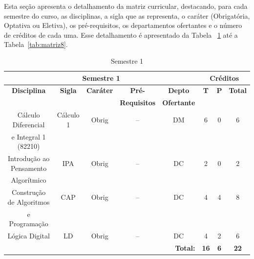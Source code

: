 Esta seção apresenta o detalhamento da matriz curricular, destacando, para cada semestre do curso, as disciplinas, a sigla que as representa, o caráter (Obrigatória, Optativa ou Eletiva), os pré-requisitos, os departamentos ofertantes e o número de  créditos de cada uma. Esse detalhamento é apresentado da Tabela ~\ref{tab:matriz1} até a Tabela~\ref{tab:matriz8}.


\singlespacing


\begin{table}[H]
\caption{Semestre 1}
\centering
\footnotesize
\begin{tabular}{|c|c|c|c|c|c|c|c|} %
\hline
\hline
\multicolumn{5}{|c|}{\textbf{Semestre 1}}  &  \multicolumn{3}{|c|}{\textbf{Créditos}} \\
\hline
\hline
\textbf{Disciplina} & \textbf{Sigla} & \textbf{Caráter} & \textbf{Pré-} & \textbf{Depto} &  \textbf{T}  &  \textbf{P}  & \textbf{Total} \\ 
& & & \textbf{Requisitos}  & \textbf{Ofertante} & & & \\
\hline 
Cálculo Diferencial & Cálculo 1 & Obrig & -- & DM  & 6 & 0 & 6 \\
e Integral 1 (82210)& & & & & & & \\
\hline
Introdução ao Pensamento & IPA & Obrig & -- & DC  & 2 & 0 & 2 \\
Algorítmico & & & & & & & \\
\hline
Construção de Algoritmos & CAP & Obrig & -- & DC  & 4 & 4 & 8 \\
e Programação & & & & & & & \\
\hline
Lógica Digital & LD & Obrig & -- & DC & 4 & 2 & 6 \\
\hline
\hline
\multicolumn{5}{|r|}{\textbf{Total:}}  &  \textbf{16}  &  \textbf{6}   & \textbf{22} \\ %
\hline
\hline
\end{tabular}
\label{tab:matriz1}
\end{table}



